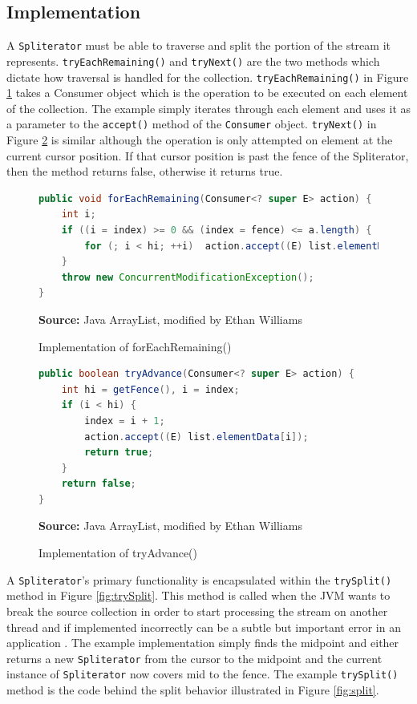 \documentclass[oneside, 12pt]{article}
\newcommand{\source}[1]{\textbf{Source:} {#1} }
\begin{document}
\subsection{Implementation} 
A \verb|Spliterator| must be able to traverse and split the portion of the stream it represents. \verb|tryEachRemaining()| and \verb|tryNext()| are the two methods which dictate how traversal is handled for the collection. \verb|tryEachRemaining()| in Figure \ref{fig:forEachRemaining} takes a Consumer object which is the operation to be executed on each element of the collection. The example simply iterates through each element and uses it as a parameter to the \verb|accept()| method of the \verb|Consumer| object. \verb|tryNext()| in Figure \ref{fig:tryAdvance} is similar although the operation is only attempted on element at the current cursor position. If that cursor position is past the fence of the Spliterator, then the method returns false, otherwise it returns true.

\begin{figure}[H]
\centering
\begin{lstlisting}[language=Java]
public void forEachRemaining(Consumer<? super E> action) {
    int i;
    if ((i = index) >= 0 && (index = fence) <= a.length) {
        for (; i < hi; ++i)  action.accept((E) list.elementData[i]);
    }
    throw new ConcurrentModificationException();
}
\end{lstlisting}
\caption{Implementation of forEachRemaining()}
\source{Java ArrayList, modified by Ethan Williams}
\label{fig:forEachRemaining}
\end{figure}

\begin{figure}[H]
\centering
\begin{lstlisting}[language=Java]
public boolean tryAdvance(Consumer<? super E> action) {
    int hi = getFence(), i = index;
    if (i < hi) {
        index = i + 1;
        action.accept((E) list.elementData[i]);
        return true;
    }
    return false;
}
\end{lstlisting}
\caption{Implementation of tryAdvance()}
\source{Java ArrayList, modified by Ethan Williams}
\label{fig:tryAdvance}
\end{figure}

A \verb|Spliterator|'s primary functionality is encapsulated within the \verb|trySplit()| method in Figure \ref{fig:trySplit}. This method is called when the JVM wants to break the source collection in order to start processing the stream on another thread and if implemented incorrectly can be a subtle but important error in an application \autocite{}. The example implementation simply finds the midpoint and either returns a new \verb|Spliterator| from the cursor to the midpoint and the current instance of \verb|Spliterator| now covers mid to the fence. The example \verb|trySplit()| method is the code behind the split behavior illustrated in Figure \ref{fig:split}.
\end{document}
